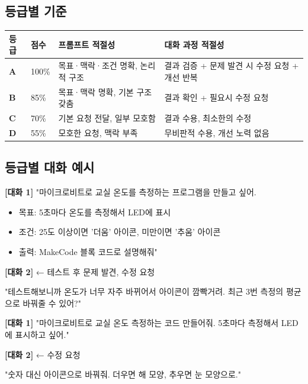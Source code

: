 \documentclass[11pt, a4paper]{article}
\begin{document}
\subsection{등급별 기준}

\begin{table}[h]
\centering
\small
\begin{tabular}{|C{1cm}|C{1cm}|L{5.5cm}|L{5.5cm}|}
\hline
{}
\textbf{등급} & \textbf{점수} & \textbf{프롬프트 적절성} & \textbf{대화 과정 적절성} \\
\hline
\textbf{A} & 100\% & 목표·맥락·조건 명확, 논리적 구조 & 결과 검증 + 문제 발견 시 수정 요청 + 개선 반복 \\
\hline
\textbf{B} & 85\% & 목표·맥락 명확, 기본 구조 갖춤 & 결과 확인 + 필요시 수정 요청 \\
\hline
\textbf{C} & 70\% & 기본 요청 전달, 일부 모호함 & 결과 수용, 최소한의 수정 \\
\hline
\textbf{D} & 55\% & 모호한 요청, 맥락 부족 & 무비판적 수용, 개선 노력 없음 \\
\hline
\end{tabular}
\end{table}

\subsection{등급별 대화 예시}

\begin{tcolorbox}[colback=lightblue, colframe=mainblue, boxrule=0.5pt, title={\textbf{A등급: 목표·맥락·조건 명확 + 결과 검증 + 개선 반복}}, fonttitle=\bfseries]
\small
\textbf{[대화 1]} "마이크로비트로 교실 온도를 측정하는 프로그램을 만들고 싶어.
\begin{itemize}
\item 목표: 5초마다 온도를 측정해서 LED에 표시
\item 조건: 25도 이상이면 '더움' 아이콘, 미만이면 '추움' 아이콘
\item 출력: MakeCode 블록 코드로 설명해줘"
\end{itemize}

\textbf{[대화 2]} ← 테스트 후 문제 발견, 수정 요청

"테스트해보니까 온도가 너무 자주 바뀌어서 아이콘이 깜빡거려. 최근 3번 측정의 평균으로 바꿔줄 수 있어?"
\end{tcolorbox}

\begin{tcolorbox}[colback=lightorange!30, colframe=accentorange, boxrule=0.5pt, title={\textbf{B등급: 목표·맥락 명확 + 필요시 수정 요청}}, fonttitle=\bfseries]
\small
\textbf{[대화 1]} "마이크로비트로 교실 온도 측정하는 코드 만들어줘. 5초마다 측정해서 LED에 표시하고 싶어."

\textbf{[대화 2]} ← 수정 요청

"숫자 대신 아이콘으로 바꿔줘. 더우면 해 모양, 추우면 눈 모양으로."
\end{tcolorbox}
\end{document}
